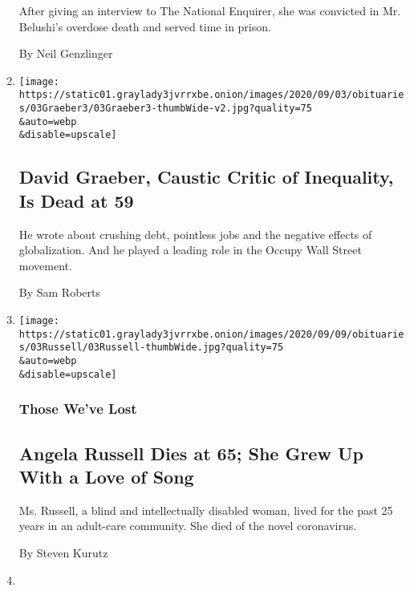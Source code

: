 \begin{enumerate}
  After giving an interview to The National Enquirer, she was convicted
  in Mr. Belushi's overdose death and served time in prison.

  By Neil Genzlinger
\item
  \href{/2020/09/04/books/david-graeber-dead.html}{}

  \texttt{[image: https://static01.graylady3jvrrxbe.onion/images/2020/09/03/obituaries/03Graeber3/03Graeber3-thumbWide-v2.jpg?quality=75\\\&auto=webp\\\&disable=upscale]}

  \hypertarget{david-graeber-caustic-critic-of-inequality-is-dead-at-59}{%
  \subsection{David Graeber, Caustic Critic of Inequality, Is Dead at
  59}\label{david-graeber-caustic-critic-of-inequality-is-dead-at-59}}

  He wrote about crushing debt, pointless jobs and the negative effects
  of globalization. And he played a leading role in the Occupy Wall
  Street movement.

  By Sam Roberts
\item
  \href{/2020/09/04/obituaries/angela-russell-dead-coronavirus.html}{}

  \texttt{[image: https://static01.graylady3jvrrxbe.onion/images/2020/09/09/obituaries/03Russell/03Russell-thumbWide.jpg?quality=75\\\&auto=webp\\\&disable=upscale]}

  \hypertarget{those-weve-lost-4}{%
  \subsubsection{Those We've Lost}\label{those-weve-lost-4}}

  \hypertarget{angela-russell-dies-at-65-she-grew-up-with-a-love-of-song}{%
  \subsection{Angela Russell Dies at 65; She Grew Up With a Love of
  Song}\label{angela-russell-dies-at-65-she-grew-up-with-a-love-of-song}}

  Ms. Russell, a blind and intellectually disabled woman, lived for the
  past 25 years in an adult-care community. She died of the novel
  coronavirus.

  By Steven Kurutz
\item
  \href{/2020/09/04/arts/salome-bey-dead.html}{}


\end{enumerate}

